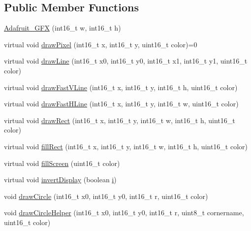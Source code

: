 \subsection*{Public Member Functions}
\begin{DoxyCompactItemize}
\item 
\hyperlink{class_adafruit___g_f_x_a6f6f1abccf677eac244fa17d105133ea}{Adafruit\+\_\+\+G\+FX} (int16\+\_\+t w, int16\+\_\+t h)
\item 
virtual void \hyperlink{class_adafruit___g_f_x_ab7fbf72885c873266f9c7eb53b5c8896}{draw\+Pixel} (int16\+\_\+t x, int16\+\_\+t y, uint16\+\_\+t color)=0
\item 
virtual void \hyperlink{class_adafruit___g_f_x_aa0ff662c2b2b48c3bac51f98c777776d}{draw\+Line} (int16\+\_\+t x0, int16\+\_\+t y0, int16\+\_\+t x1, int16\+\_\+t y1, uint16\+\_\+t color)
\item 
virtual void \hyperlink{class_adafruit___g_f_x_a1cffbb1d69c5faf49cd0cff27686a837}{draw\+Fast\+V\+Line} (int16\+\_\+t x, int16\+\_\+t y, int16\+\_\+t h, uint16\+\_\+t color)
\item 
virtual void \hyperlink{class_adafruit___g_f_x_a4d42e7cc577c1eb5b06fe656786c9c79}{draw\+Fast\+H\+Line} (int16\+\_\+t x, int16\+\_\+t y, int16\+\_\+t w, uint16\+\_\+t color)
\item 
virtual void \hyperlink{class_adafruit___g_f_x_a9ec2c2ab426503e4f7deddb93bb916f6}{draw\+Rect} (int16\+\_\+t x, int16\+\_\+t y, int16\+\_\+t w, int16\+\_\+t h, uint16\+\_\+t color)
\item 
virtual void \hyperlink{class_adafruit___g_f_x_aa43cf1dfe6c17d040a0f1fd5ffbe9d69}{fill\+Rect} (int16\+\_\+t x, int16\+\_\+t y, int16\+\_\+t w, int16\+\_\+t h, uint16\+\_\+t color)
\item 
virtual void \hyperlink{class_adafruit___g_f_x_a2b2730aaf2208990928f9c0f85558527}{fill\+Screen} (uint16\+\_\+t color)
\item 
virtual void \hyperlink{class_adafruit___g_f_x_a2fa315803f39a5e73b1841874daf0483}{invert\+Display} (boolean \hyperlink{dac___m_c_p4725_8cpp_ac2e790a754ca79a6e539135dc35f4fc0}{i})
\item 
void \hyperlink{class_adafruit___g_f_x_a648d2d6765e488b4556e802167d885fb}{draw\+Circle} (int16\+\_\+t x0, int16\+\_\+t y0, int16\+\_\+t r, uint16\+\_\+t color)
\item 
void \hyperlink{class_adafruit___g_f_x_a3f2dd7b698e7b95ebf9fecf992ff802e}{draw\+Circle\+Helper} (int16\+\_\+t x0, int16\+\_\+t y0, int16\+\_\+t r, uint8\+\_\+t cornername, uint16\+\_\+t color)
\item 

\end{DoxyCompactItemize}
